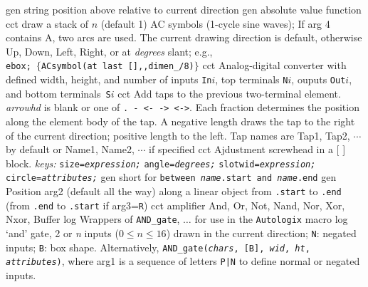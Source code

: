 %
%
  {gen}%
  {string position above relative to current direction}%
%
  {gen}%
  {absolute value function}%
%
  {cct}%
  {draw a stack of $n$ (default 1) AC symbols
   (1-cycle sine waves); If arg 4 contains A, two arcs
   are used.  The current drawing direction is default, otherwise Up, Down,
   Left, Right, or at {\sl degrees} slant;  e.g.,\\ 
   {\tt ebox; $\lbrace$ACsymbol(at last [],{,}dimen\_/8)$\rbrace$}}%
%
  {cct}%
  {Analog-digital converter with defined width, height, and number of
   inputs {\tt In$i$}, top terminals {\tt N$i$}, ouputs {\tt Out$i$},
    and bottom terminals~{\tt S$i$}}%
%
  {cct}%
  {Add taps to the previous two-terminal element.
   {\sl arrowhd} is blank or one of {\tt . - <- -> <->}.
   Each fraction determines the position along the element body of the tap.
   A negative length draws the tap to the right of the current
   direction; positive length to the left.
   Tap names are Tap1, Tap2, $\cdots$ by default  or
   Name1, Name2, $\cdots$ if specified 
   }%
%
  {cct}%
  { Ajdustment screwhead in a [ ] block.
   {\sl keys:}
    {\tt size={\sl expression;}}
    {\tt angle={\sl degrees;}}
    {\tt slotwid={\sl expression;}}
    {\tt circle={\sl attributes;}}}%
%
  {gen}%
  {short for {\tt between {\sl name}.start and {\sl name}.end}}%
%
  {gen}%
  {Position arg2 (default all the way) along a linear object
   from {\tt .start} to {\tt .end}
   (from {\tt .end} to {\tt .start} if arg3={\tt R}) }%
%
  {cct}%
  {amplifier}%
%
 {And, Or, Not, Nand, Nor, Xor, Nxor, Buffer}{}%
  {log}%
  {Wrappers of {\tt AND\_gate}, $\ldots$ for use in the {\tt Autologix}
   macro}%
%
  {log}%
  {`and' gate, 2 or {\sl n\/} inputs ($0 \leq n \leq 16$) drawn in the
   current direction;
   {\tt N}: negated inputs; {\tt B}: box shape.
   Alternatively, {\tt AND\_gate({\sl chars}, [B], {\sl wid},
    {\sl ht}, {\sl attributes})}, where
   arg1 is a sequence of letters {\tt P|N} to define
   normal or negated inputs.
    }%
